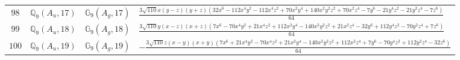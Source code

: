 \documentclass[fleqn,8pt,landscape]{jsarticle}
\begin{document}
\begin{table}[ht!]
\begin{center}
\begin{tabular}{cccl}
$ 98 $ & $ \mathbb{Q}_{9}(A_{u},17) $ & $ \mathbb{G}_{9}(A_{g},17) $ & $ \frac{3 \sqrt{110} x \left(y - z\right) \left(y + z\right) \left(32 x^{6} - 112 x^{4} y^{2} - 112 x^{4} z^{2} + 70 x^{2} y^{4} + 140 x^{2} y^{2} z^{2} + 70 x^{2} z^{4} - 7 y^{6} - 21 y^{4} z^{2} - 21 y^{2} z^{4} - 7 z^{6}\right)}{64} $ \\
$ 99 $ & $ \mathbb{Q}_{9}(A_{u},18) $ & $ \mathbb{G}_{9}(A_{g},18) $ & $ \frac{3 \sqrt{110} y \left(x - z\right) \left(x + z\right) \left(7 x^{6} - 70 x^{4} y^{2} + 21 x^{4} z^{2} + 112 x^{2} y^{4} - 140 x^{2} y^{2} z^{2} + 21 x^{2} z^{4} - 32 y^{6} + 112 y^{4} z^{2} - 70 y^{2} z^{4} + 7 z^{6}\right)}{64} $ \\
$ 100 $ & $ \mathbb{Q}_{9}(A_{u},19) $ & $ \mathbb{G}_{9}(A_{g},19) $ & $ - \frac{3 \sqrt{110} z \left(x - y\right) \left(x + y\right) \left(7 x^{6} + 21 x^{4} y^{2} - 70 x^{4} z^{2} + 21 x^{2} y^{4} - 140 x^{2} y^{2} z^{2} + 112 x^{2} z^{4} + 7 y^{6} - 70 y^{4} z^{2} + 112 y^{2} z^{4} - 32 z^{6}\right)}{64} $ \\
 \hline \hline
\end{tabular}
\end{center}
\end{table}
\end{document}
